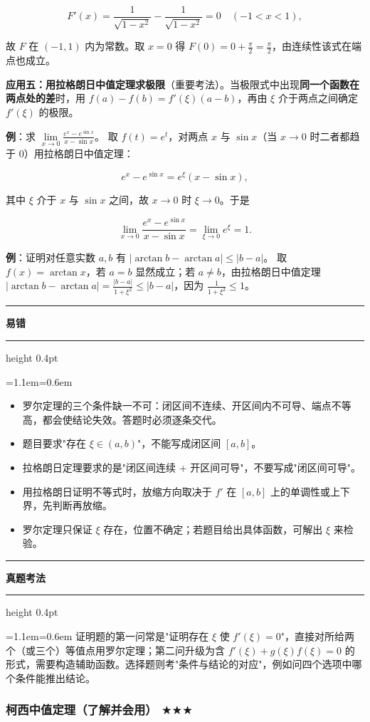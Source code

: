 \documentclass[11pt,openany,UTF8]{ctexbook}
\newcommand{\callouthead}[2]{%
  \par\addvspace{7pt}\noindent
  {\color{#1}\rule[-0.15em]{3pt}{1.05em}}\hspace{0.5em}%
  {\bfseries\color{#1}#2}\par\nobreak\vspace{-0.35em}%
  {\color{rulesep}\hrule height 0.4pt}\nobreak\vspace{0.45em}%
  \begingroup\small\setlength{\parindent}{0pt}%
  \leftskip=1.1em\rightskip=0.6em\noindent\ignorespaces}
\newcommand{\calloutend}{\par\endgroup\addvspace{7pt}}
\newenvironment{callwarn}[1]{\callouthead{warnbar}{#1}}{\calloutend}
\newenvironment{callexam}[1]{\callouthead{exambar}{#1}}{\calloutend}
\begin{document}
\[F'(x)=\frac{1}{\sqrt{1-x^2}}-\frac{1}{\sqrt{1-x^2}}=0\quad(-1<x<1),\]

故 $F$ 在 $(-1,1)$ 内为常数。取 $x=0$ 得 $F(0)=0+\frac\pi2=\frac\pi2$，由连续性该式在端点也成立。

\textbf{应用五：用拉格朗日中值定理求极限}（重要考法）。当极限式中出现\textbf{同一个函数在两点处的差}时，用 $f(a)-f(b)=f'(\xi)(a-b)$，再由 $\xi$ 介于两点之间确定 $f'(\xi)$ 的极限。

\textbf{例}：求 $\lim\limits_{x\to 0}\frac{e^{x}-e^{\sin x}}{x-\sin x}$。 取 $f(t)=e^t$，对两点 $x$ 与 $\sin x$（当 $x\to0$ 时二者都趋于 $0$）用拉格朗日中值定理：

\[e^{x}-e^{\sin x}=e^{\xi}(x-\sin x),\]

其中 $\xi$ 介于 $x$ 与 $\sin x$ 之间，故 $x\to0$ 时 $\xi\to0$。于是

\[\lim_{x\to 0}\frac{e^{x}-e^{\sin x}}{x-\sin x}=\lim_{\xi\to 0}e^{\xi}=1 .\]

\textbf{例}：证明对任意实数 $a,b$ 有 $|\arctan b-\arctan a|\le|b-a|$。 取 $f(x)=\arctan x$，若 $a=b$ 显然成立；若 $a\ne b$，由拉格朗日中值定理 $|\arctan b-\arctan a|=\frac{|b-a|}{1+\xi^2}\le|b-a|$，因为 $\frac{1}{1+\xi^2}\le1$。

\begin{callwarn}{易错}
\begin{itemize}
\item 罗尔定理的三个条件缺一不可：闭区间不连续、开区间内不可导、端点不等高，都会使结论失效。答题时必须逐条交代。
\item 题目要求"存在 $\xi\in(a,b)$"，不能写成闭区间 $[a,b]$。
\item 拉格朗日定理要求的是"闭区间连续 + 开区间可导"，不要写成"闭区间可导"。
\item 用拉格朗日证明不等式时，放缩方向取决于 $f'$ 在 $[a,b]$ 上的单调性或上下界，先判断再放缩。
\item 罗尔定理只保证 $\xi$ 存在，位置不确定；若题目给出具体函数，可解出 $\xi$ 来检验。
\end{itemize}
\end{callwarn}

\begin{callexam}{真题考法}
证明题的第一问常是"证明存在 $\xi$ 使 $f'(\xi)=0$"，直接对所给两个（或三个）等值点用罗尔定理；第二问升级为含 $f'(\xi)+g(\xi)f(\xi)=0$ 的形式，需要构造辅助函数。选择题则考"条件与结论的对应"，例如问四个选项中哪个条件能推出结论。

\end{callexam}

\subsubsection{柯西中值定理（了解并会用） $\bigstar$$\bigstar$$\bigstar$}
\end{document}
